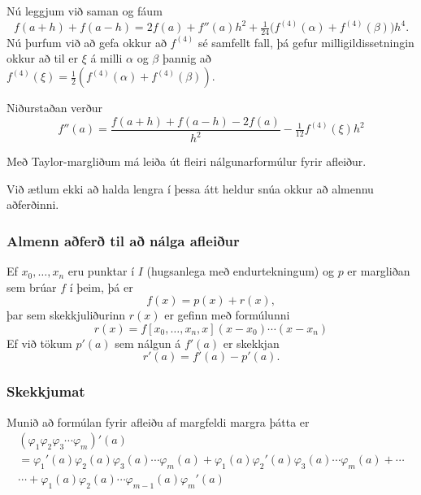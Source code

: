 \documentclass[icelandic,a4paper,12pt]{article}
\begin{document}
\pause
\smallskip
Nú leggjum við saman og fáum
$$
f(a+h)+f(a-h)=2f(a) +f''(a)h^2+\tfrac
1{24}\big(f^{(4)}(\alpha)+f^{(4)}(\beta)\big)h^4.
$$
Nú þurfum við að gefa okkur að $f^{(4)}$ sé samfellt fall, þá gefur
milligildissetningin okkur að til er $\xi$ á milli $\alpha$ og $\beta$
þannig að $f^{(4)}(\xi)=\tfrac 12 (f^{(4)}(\alpha)+f^{(4)}(\beta))$. 



Niðurstaðan verður 
$$
f''(a)=\dfrac{f(a+h)+f(a-h)-2f(a)}{h^2}-\tfrac 1{12}f^{(4)}(\xi)h^2
$$

Með Taylor-margliðum  má leiða út fleiri nálgunarformúlur fyrir
afleiður.  

Við ætlum ekki að halda lengra í þessa átt heldur snúa okkur að
almennu aðferðinni.



\subsubsection{Almenn aðferð til að nálga afleiður} 
Ef $x_0,\ldots, x_n$ eru punktar í $I$ (hugsanlega með endurtekningum)
og $p$ er margliðan sem brúar $f$ í þeim, þá er 
\begin{equation*}
  f(x) = p(x) + r(x),
\end{equation*}
þar sem  skekkjuliðurinn $r(x)$ er gefinn með formúlunni
$$
r(x)=f[x_0,\ldots,x_n,x](x-x_0)\cdots(x-x_n)
$$
Ef við tökum $p'(a)$ sem nálgun á $f'(a)$ er skekkjan
\begin{equation*}
r'(a) =  f'(a) - p'(a). 
\end{equation*}



\subsubsection{Skekkjumat} 
Munið að formúlan fyrir afleiðu af margfeldi margra þátta er
\begin{multline*}
  (\varphi_1\varphi_2\varphi_3\cdots\varphi_m)'(a)\\
=\varphi_1'(a)\varphi_2(a)\varphi_3(a)\cdots\varphi_m(a)
+\varphi_1(a)\varphi_2'(a)\varphi_3(a)\cdots\varphi_m(a)
+\cdots\\
\cdots+\varphi_1(a)\varphi_2(a)\cdots \varphi_{m-1}(a)\varphi_m'(a)\\
\end{multline*}
\end{document}

